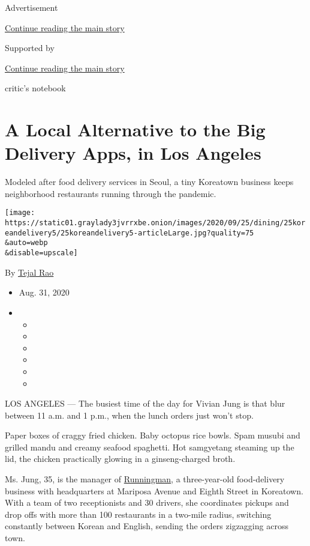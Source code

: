 Advertisement

\protect\hyperlink{after-top}{Continue reading the main story}

Supported by

\protect\hyperlink{after-sponsor}{Continue reading the main story}

critic's notebook

\hypertarget{a-local-alternative-to-the-big-delivery-apps-in-los-angeles}{%
\section{A Local Alternative to the Big Delivery Apps, in Los
Angeles}\label{a-local-alternative-to-the-big-delivery-apps-in-los-angeles}}

Modeled after food delivery services in Seoul, a tiny Koreatown business
keeps neighborhood restaurants running through the pandemic.

\texttt{[image: https://static01.graylady3jvrrxbe.onion/images/2020/09/25/dining/25koreandelivery5/25koreandelivery5-articleLarge.jpg?quality=75\\\&auto=webp\\\&disable=upscale]}

By \href{https://www.nytimes3xbfgragh.onion/by/tejal-rao}{Tejal Rao}

\begin{itemize}
\item
  Aug. 31, 2020
\item
  \begin{itemize}
  \item
  \item
  \item
  \item
  \item
  \item
  \end{itemize}
\end{itemize}

LOS ANGELES --- The busiest time of the day for Vivian Jung is that blur
between 11 a.m. and 1 p.m., when the lunch orders just won't stop.

Paper boxes of craggy fried chicken. Baby octopus rice bowls. Spam
musubi and grilled mandu and creamy seafood spaghetti. Hot samgyetang
steaming up the lid, the chicken practically glowing in a
ginseng-charged broth.

Ms. Jung, 35, is the manager of
\href{https://www.facebookcorewwwi.onion/RUNNINGMAN213/}{Runningman}, a
three-year-old food-delivery business with headquarters at Mariposa
Avenue and Eighth Street in Koreatown. With a team of two receptionists
and 30 drivers, she coordinates pickups and drop offs with more than 100
restaurants in a two-mile radius, switching constantly between Korean
and English, sending the orders zigzagging across town.


